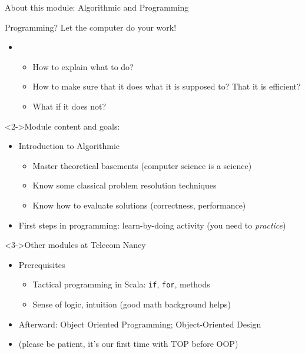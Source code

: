 \begin{frame}[squeeze]{About this module: \alert{Algorithmic and Programming}}
  \begin{block}{Programming? Let the computer do your work!}
    \begin{itemize}
    \item[] ~\vspace{-\baselineskip}
      \begin{itemize}
      \item How to explain what to do?
      \item How to make sure that it does what it is supposed to? That
        it is efficient?
      \item What if it does not?
      \end{itemize}
    \end{itemize}
  \end{block}
  \vspace{-.5\baselineskip}

  \begin{block}<2->{Module content and goals: }
    \begin{itemize}
    \item Introduction to Algorithmic
      \begin{itemize}
      \item Master theoretical basements (computer science is a science)
      \item Know some classical problem resolution techniques
      \item Know how to evaluate solutions (correctness, performance)
      \end{itemize}

    \item First steps in programming: learn-by-doing activity (you need to \textit{practice})
    \end{itemize}
  \end{block}
  \vspace{-.5\baselineskip}

  \begin{block}<3->{Other modules at Telecom Nancy}
    \begin{itemize}
    \item Prerequisites
      \begin{itemize}
      \item Tactical programming in Scala: \texttt{if}, \texttt{for}, methods
      \item Sense of logic, intuition (good math background helps)
      \end{itemize}
    \item Afterward: Object Oriented Programming; Object-Oriented Design

      \medskip
    \item[] {\small(please be patient, it's our first time with TOP before OOP)}
    \end{itemize}
  \end{block}
\end{frame}
